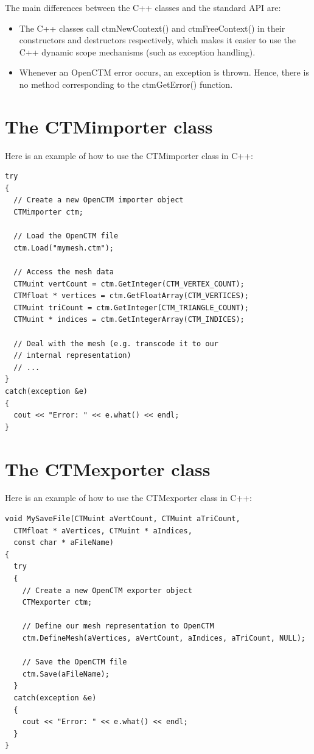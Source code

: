 The main differences between the C++ classes and the standard API are:

\begin{itemize}
    \item The C++ classes call ctmNewContext() and ctmFreeContext() in their
          constructors and destructors respectively, which makes it easier to
          use the C++ dynamic scope mechanisms (such as exception handling).
    \item Whenever an OpenCTM error occurs, an exception is thrown. Hence, there
          is no method corresponding to the ctmGetError() function.
\end{itemize}

\section{The CTMimporter class}
Here is an example of how to use the CTMimporter class in C++:

\begin{lstlisting}
try
{
  // Create a new OpenCTM importer object
  CTMimporter ctm;

  // Load the OpenCTM file
  ctm.Load("mymesh.ctm");

  // Access the mesh data
  CTMuint vertCount = ctm.GetInteger(CTM_VERTEX_COUNT);
  CTMfloat * vertices = ctm.GetFloatArray(CTM_VERTICES);
  CTMuint triCount = ctm.GetInteger(CTM_TRIANGLE_COUNT);
  CTMuint * indices = ctm.GetIntegerArray(CTM_INDICES);

  // Deal with the mesh (e.g. transcode it to our
  // internal representation)
  // ...
}
catch(exception &e)
{
  cout << "Error: " << e.what() << endl;
}
\end{lstlisting}


\section{The CTMexporter class}
Here is an example of how to use the CTMexporter class in C++:

\begin{lstlisting}
void MySaveFile(CTMuint aVertCount, CTMuint aTriCount,
  CTMfloat * aVertices, CTMuint * aIndices,
  const char * aFileName)
{
  try
  {
    // Create a new OpenCTM exporter object
    CTMexporter ctm;

    // Define our mesh representation to OpenCTM
    ctm.DefineMesh(aVertices, aVertCount, aIndices, aTriCount, NULL);

    // Save the OpenCTM file
    ctm.Save(aFileName);
  }
  catch(exception &e)
  {
    cout << "Error: " << e.what() << endl;
  }
}
\end{lstlisting}



